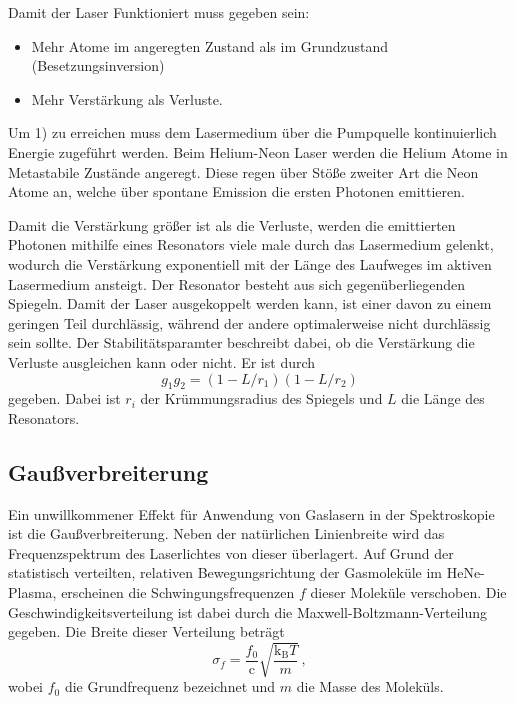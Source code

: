 Damit der Laser Funktioniert muss gegeben sein:
\begin{itemize}
	\item Mehr Atome im angeregten Zustand als im Grundzustand (Besetzungsinversion)
	\item Mehr Verstärkung als Verluste.
\end{itemize}

Um 1) zu erreichen muss dem Lasermedium über die Pumpquelle kontinuierlich Energie zugeführt werden.
Beim Helium-Neon Laser werden die Helium Atome in Metastabile Zustände angeregt.
Diese regen über Stöße zweiter Art die Neon Atome an, welche über spontane Emission die ersten Photonen emittieren.

Damit die Verstärkung größer ist als die Verluste, werden die emittierten Photonen mithilfe eines Resonators viele male durch das Lasermedium gelenkt, wodurch die Verstärkung exponentiell mit der Länge des Laufweges im aktiven Lasermedium ansteigt.
Der Resonator besteht aus sich gegenüberliegenden Spiegeln.
Damit der Laser ausgekoppelt werden kann, ist einer davon zu einem geringen Teil durchlässig, während der andere optimalerweise nicht durchlässig sein sollte.
Der Stabilitätsparamter beschreibt dabei, ob die Verstärkung die Verluste ausgleichen kann oder nicht. 
Er ist durch 
\begin{equation*}
	g_1 g_2 = (1-L/r_1)(1-L/r_2)
\end{equation*}
gegeben.
Dabei ist $r_i$ der Krümmungsradius des Spiegels und $L$ die Länge des Resonators.

\subsection{Gaußverbreiterung}
\label{subsec:gaußverbreiterung}
Ein unwillkommener Effekt für Anwendung von Gaslasern in der Spektroskopie ist
die Gaußverbreiterung.
Neben der natürlichen Linienbreite wird das Frequenzspektrum des Laserlichtes
von dieser überlagert.
Auf Grund der statistisch verteilten, relativen Bewegungsrichtung der
Gasmoleküle im HeNe-Plasma, erscheinen die Schwingungsfrequenzen $f$ dieser
Moleküle verschoben.
Die Geschwindigkeitsverteilung ist dabei durch die Maxwell-Boltzmann-Verteilung
gegeben. Die Breite dieser Verteilung beträgt
\begin{equation}
\label{eq:sigma_maxwell_boltzmann}
    \sigma_f = \frac{f_0}{\mathrm{c}}\sqrt{\frac{\mathrm{k}_\text{B}T}{m}}\,,
\end{equation}
wobei $f_0$ die Grundfrequenz bezeichnet und $m$ die Masse des Moleküls.
